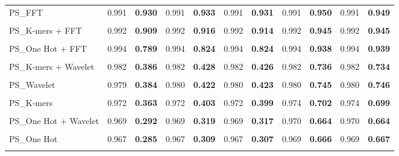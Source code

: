 \begin{table*}[htbp]
\begin{tabular}{lcccccccccc}
PS\_FFT & 0.991 & \textbf{0.930} & 0.991 & \textbf{0.933} & 0.991 & \textbf{0.931} & 0.991 & \textbf{0.950} & 0.991 & \textbf{0.949} \\\\
PS\_K-mers + FFT & 0.992 & \textbf{0.909} & 0.992 & \textbf{0.916} & 0.992 & \textbf{0.914} & 0.992 & \textbf{0.945} & 0.992 & \textbf{0.945} \\\\
PS\_One Hot + FFT & 0.994 & \textbf{0.789} & 0.994 & \textbf{0.824} & 0.994 & \textbf{0.824} & 0.994 & \textbf{0.938} & 0.994 & \textbf{0.939} \\\\
PS\_K-mers + Wavelet & 0.982 & \textbf{0.386} & 0.982 & \textbf{0.428} & 0.982 & \textbf{0.426} & 0.982 & \textbf{0.736} & 0.982 & \textbf{0.734} \\\\
PS\_Wavelet & 0.979 & \textbf{0.384} & 0.980 & \textbf{0.422} & 0.980 & \textbf{0.423} & 0.980 & \textbf{0.745} & 0.980 & \textbf{0.746} \\\\
PS\_K-mers & 0.972 & \textbf{0.363} & 0.972 & \textbf{0.403} & 0.972 & \textbf{0.399} & 0.974 & \textbf{0.702} & 0.974 & \textbf{0.699} \\\\
PS\_One Hot + Wavelet & 0.969 & \textbf{0.292} & 0.969 & \textbf{0.319} & 0.969 & \textbf{0.317} & 0.970 & \textbf{0.664} & 0.970 & \textbf{0.664} \\\\
PS\_One Hot & 0.967 & \textbf{0.285} & 0.967 & \textbf{0.309} & 0.967 & \textbf{0.307} & 0.969 & \textbf{0.666} & 0.969 & \textbf{0.667} \\\\
\bottomrule
\end{tabular}
\end{table*}